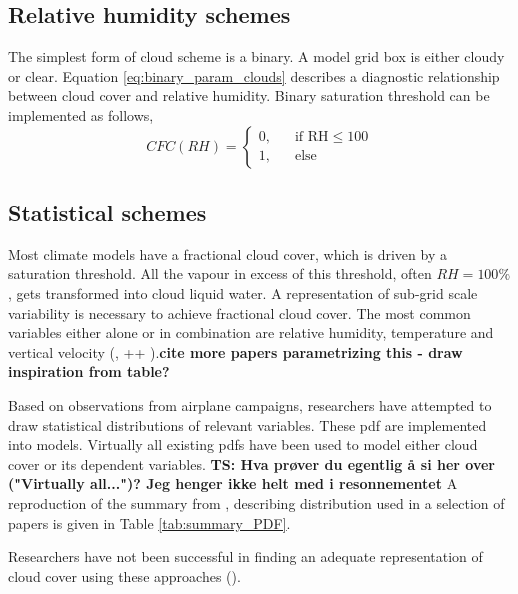 \subsection{Relative humidity schemes}
The simplest form of cloud scheme is a binary. A model grid box is either cloudy or clear. Equation \eqref{eq:binary_param_clouds} describes a diagnostic relationship between cloud cover and relative humidity. Binary saturation threshold can be implemented as follows,
\begin{equation} \label{eq:binary_param_clouds}
    CFC\left(RH\right) = 
     \begin{cases}
       \text{0,} &\quad\text{if RH}\le100\\
       \text{1,} &\quad\text{else}
     \end{cases}
\end{equation}

\subsection{Statistical schemes}
Most climate models have a fractional cloud cover, which is driven by a saturation threshold. All the vapour in excess of this threshold, often $RH=100\%$, gets transformed into cloud liquid water. A representation of sub-grid scale variability is necessary to achieve fractional cloud cover. The most common variables either alone or in combination are relative humidity, temperature and vertical velocity (\cite{Golaz2002_part1}, ++ ).\textbf{cite more papers parametrizing this - draw inspiration from table?}  

Based on observations from airplane campaigns, researchers have attempted to draw statistical distributions of relevant variables. These \acrfull{pdf} are implemented into models. Virtually all existing \acrshort{pdf}s have been used to model either cloud cover or its dependent variables. \textbf{TS: Hva prøver du egentlig å si her over ("Virtually all...")? Jeg henger ikke helt med i resonnementet} %
A reproduction of the summary from \cite{Tompkins2009CloudParametrization}, describing distribution used in a selection of papers is given in Table \ref{tab:summary_PDF}.

Researchers have not been successful in finding an adequate representation of cloud cover using these approaches (\cite{Tompkins2009CloudParametrization}). 

